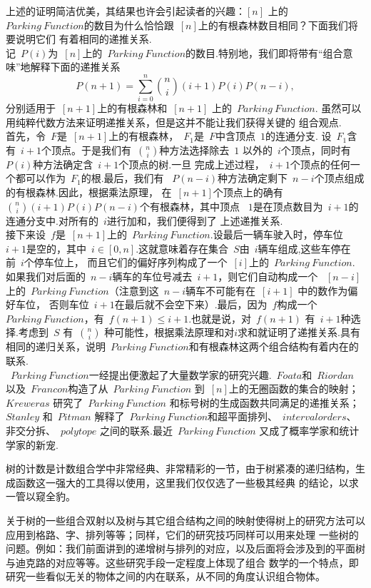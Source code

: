 \documentclass[a4paper,11pt]{article}
\begin{document}
\indent 上述的证明简洁优美，其结果也许会引起读者的兴趣：$[n]$ 上的 ~$Parking\ Function$的数目为什么恰恰跟~$[n]$上的有根森林数目相同？下面我们将要说明它们
有着相同的递推关系.\\
\indent 记~$P(i)$为~$[n]$上的~$Parking\ Function$的数目.特别地，我们即将带有“组合意味”地解释下面的递推关系
\[P(n+1)=\sum_{i=0}^n \binom{n}{i}(i+1)P(i)P(n-i),\]
分别适用于~$[n+1]$上的有根森林和~$[n+1]$ 上的~$Parking\ Function$. 虽然可以用纯粹代数方法来证明递推关系，但是这并不能让我们获得关键的
组合观点.\\
\indent 首先，令~$F$是~$[n+1]$上的有根森林，~$F_1$是~$F$中含顶点~$1$的连通分支.
设~$F_1$含有~$i+1$个顶点。于是我们有~$\binom{n}{i}$种方法选择除去~$1$
以外的~$i$个顶点，同时有~$P(i)$种方法确定含~$i+1$个顶点的树.一旦
完成上述过程，~$i+1$个顶点的任何一个都可以作为~$F_1$的根.最后，我们有
~$P(n-i)$种方法确定剩下~$n-i$个顶点组成的有根森林.因此，根据乘法原理，
在~$[n+1]$个顶点上的确有~$\binom{n}{i}(i+1)P(i)P(n-i)$个有根森林，其中顶点
~$1$是在顶点数目为~$i+1$的连通分支中.对所有的~$i$进行加和，我们便得到了
上述递推关系.\\
\indent 接下来设~$f$是~$[n+1]$上的~$Parking\ Function$.设最后一辆车驶入时，停车位~$i+1$是空的，其中~$i \in [0,n]$.这就意味着存在集合~$S$由~$i$辆车组成,这些车停在前~$i$个停车位上，
而且它们的偏好序列构成了一个~$[i]$上的~$Parking\ Function$.
如果我们对后面的~$n-i$辆车的车位号减去~$i+1$，则它们自动构成一个
~$[n-i]$上的~$Parking\ Function$（注意到这~$n-i$辆车不可能有在~$[i+1]$ 中的数作为偏好车位，
否则车位~$i+1$在最后就不会空下来）.最后，因为~$f$构成一个~$Parking\ Function$，有~$f(n+1)\leq i+1$.也就是说，对~$f(n+1)$ 有~$i+1$种选择.考虑到~$S$ 有~$\binom{n}{i}$
种可能性，根据乘法原理和对$i$求和就证明了递推关系.具有相同的递归关系，说明~$Parking\ Function$和有根森林这两个组合结构有着内在的联系.\\
\indent ~$Parking\ Function$一经提出便激起了大量数学家的研究兴趣.~$Foata$和~$Riordan$ 以及~$Francon$构造了从~$Parking\ Function$ 到~$[n]$上的无圈函数的集合的映射；~$Kreweras$ 研究了~$Parking\ Function$ 和标号树的生成函数共同满足的递推关系；~$Stanley$ 和~$Pitman$ 解释了~$Parking\ Function$和超平面排列、~$interval orders$、 非交分拆、~$polytope$ 之间的联系.最近~$Parking\ Function$ 又成了概率学家和统计学家的新宠.










树的计数是计数组合学中非常经典、非常精彩的一节，由于树紧凑的递归结构，生成函数这一强大的工具得以使用，这里我们仅仅选了一些极其经典
的结论，以求一管以窥全豹。

关于树的一些组合双射以及树与其它组合结构之间的映射使得树上的研究方法可以应用到格路、字、排列等等；同样，它们的研究技巧同样可以用来处理
一些树的问题。例如：我们前面讲到的递增树与排列的对应，以及后面将会涉及到的平面树与迪克路的对应等等。这些研究手段一定程度上体现了组合
数学的一个特点，即研究一些看似无关的物体之间的内在联系，从不同的角度认识组合物体。
\end{document}

